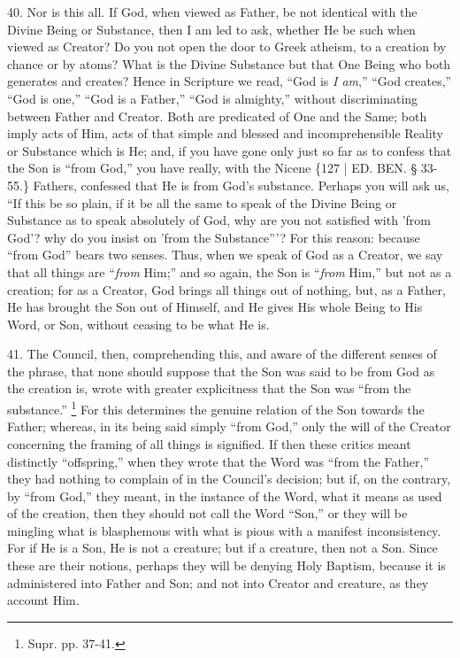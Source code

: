 40. Nor is this all. If God,
when viewed as Father, be not identical with the Divine Being or
Substance, then I am led to ask, whether He be such when viewed as
Creator? Do you not open the door to Greek atheism, to a creation by
chance or by atoms? What is the Divine Substance but that One Being
who both generates and creates? Hence in Scripture we read, ``God is \emph{I
am},'' ``God creates,'' ``God is one,'' ``God is a Father,'' ``God is
almighty,'' without discriminating between Father and Creator. Both are
predicated of One and the Same; both imply acts of Him, acts of that
simple and blessed and incomprehensible Reality or Substance which is
He; and, if you have gone only just so far as to confess that the Son
is ``from God,'' you have really, with the Nicene \{127 | ED. BEN.
§ 33-55.\} Fathers, confessed that He is from God's substance. Perhaps
you will ask us, ``If this be so plain, if it be all the same to speak
of the Divine Being or Substance as to speak absolutely of God, why
are you not satisfied with 'from God'? why do you insist on 'from the
Substance'''? For this reason: because ``from God'' bears two senses.
Thus, when we speak of God as a Creator, we say that all things are ``\emph{from}
Him;'' and so again, the Son is ``\emph{from} Him,'' but not as a
creation; for as a Creator, God brings all things out of nothing, but,
as a Father, He has brought the Son out of Himself, and He gives His
whole Being to His Word, or Son, without ceasing to be what He is.

41. The Council, then,
comprehending this, and aware of the different senses of the phrase,
that none should suppose that the Son was said to be from God as the
creation is, wrote with greater explicitness that the Son was ``from
the substance.'' \footnote{Supr. pp. 37-41.} For this
determines the genuine relation of the Son towards the Father;
whereas, in its being said simply ``from God,'' only the will of the
Creator concerning the framing of all things is signified. If then
these critics meant distinctly ``offspring,'' when they wrote that the
Word was ``from the Father,'' they had nothing to complain of in the
Council's decision; but if, on the contrary, by ``from God,'' they
meant, in the instance of the Word, what it means as used of the
creation, then they should not call the Word ``Son,'' or they will be
mingling what is blasphemous with what is pious with a manifest
inconsistency. For if He is a Son, He is not a creature; but if a
creature, then not a Son. Since these are their notions, perhaps they
will be denying Holy Baptism, because it is administered into Father
and Son; and not into Creator and creature, as they account Him.

